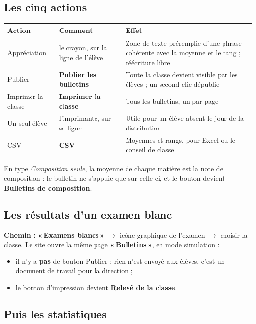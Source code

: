 \documentclass[11pt,a4paper]{article}
\newcommand{\menu}[1]{\textbf{«\,#1\,»}}
\newcommand{\bouton}[1]{\textbf{#1}}
\begin{document}
\subsection{Les cinq actions}

\begin{center}
\renewcommand{\arraystretch}{1.25}
\begin{tabularx}{\textwidth}{@{} >{\raggedright}p{3.5cm} >{\raggedright}p{4.2cm} X@{}}
\toprule
\textbf{Action} & \textbf{Comment} & \textbf{Effet} \\
\midrule
Appréciation & le crayon, sur la ligne de l'élève & Zone de texte préremplie d'une phrase
cohérente avec la moyenne et le rang ; réécriture libre \\
Publier & \bouton{Publier les bulletins} & Toute la classe devient visible par les élèves ;
un second clic dépublie \\
Imprimer la classe & \bouton{Imprimer la classe} & Tous les bulletins, un par page \\
Un seul élève & l'imprimante, sur sa ligne & Utile pour un élève absent le jour de la
distribution \\
CSV & \bouton{CSV} & Moyennes et rangs, pour Excel ou le conseil de classe \\
\bottomrule
\end{tabularx}
\end{center}

En type \emph{Composition seule}, la moyenne de chaque matière est la note de
composition : le bulletin ne s'appuie que sur celle-ci, et le bouton devient
\bouton{Bulletins de composition}.

\subsection{Les résultats d'un examen blanc}

\textbf{Chemin :} \menu{Examens blancs} $\rightarrow$ icône graphique de l'examen
$\rightarrow$ choisir la classe. Le site ouvre la même page \menu{Bulletins}, en
mode simulation :

\begin{itemize}
  \item il n'y a \textbf{pas} de bouton Publier : rien n'est envoyé aux élèves,
        c'est un document de travail pour la direction ;
  \item le bouton d'impression devient \bouton{Relevé de la classe}.
\end{itemize}

\subsection{Puis les statistiques}
\end{document}
